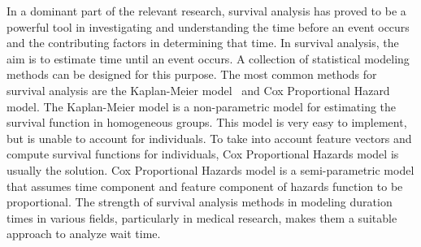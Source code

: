 In a dominant part of the relevant research, survival analysis has proved to be a powerful tool in investigating and understanding the time before an event occurs and the contributing factors in determining that time. In survival analysis, the aim is to estimate time until an event occurs. A collection of statistical modeling methods can be designed for this purpose. The most common methods for survival analysis are the Kaplan-Meier model~\cite{kaplan1958nonparametric} and Cox Proportional Hazard~\cite{cox1972regression} model. The Kaplan-Meier model is a non-parametric model for estimating the survival function in homogeneous groups. This model is very easy to implement, but is unable to account for individuals. To take into account feature vectors and compute survival functions for individuals, Cox Proportional Hazards model is usually the solution. Cox Proportional Hazards model is a semi-parametric model that assumes time component and feature component of hazards function to be proportional. The strength of survival analysis methods in modeling duration times in various fields, particularly in medical research, makes them a suitable approach to analyze wait time.

